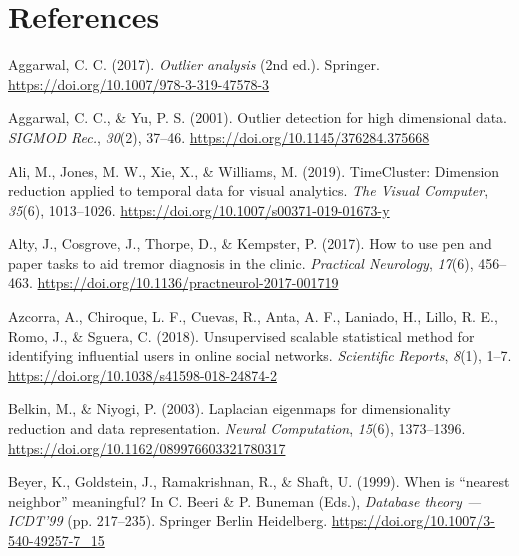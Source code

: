 \documentclass[
  10pt]{article}
\newlength{\cslhangindent}
\newlength{\cslentryspacingunit} %
\newenvironment{CSLReferences}[2] %
 {%
  \setlength{\parindent}{0pt}
  \ifodd #1
  \let\oldpar\par
  \def\par{\hangindent=\cslhangindent\oldpar}
  \fi
  \setlength{\parskip}{#2\cslentryspacingunit}
 }%
 {}
\begin{document}
\section*{References}

\hypertarget{refs}{}
\begin{CSLReferences}{1}{0}
\leavevmode{}%
Aggarwal, C. C. (2017). \emph{Outlier analysis} (2nd ed.). Springer. \url{https://doi.org/10.1007/978-3-319-47578-3}

\leavevmode{}%
Aggarwal, C. C., \& Yu, P. S. (2001). Outlier detection for high dimensional data. \emph{SIGMOD Rec.}, \emph{30}(2), 37--46. \url{https://doi.org/10.1145/376284.375668}

\leavevmode{}%
Ali, M., Jones, M. W., Xie, X., \& Williams, M. (2019). Time{C}luster: Dimension reduction applied to temporal data for visual analytics. \emph{The Visual Computer}, \emph{35}(6), 1013--1026. \url{https://doi.org/10.1007/s00371-019-01673-y}

\leavevmode{}%
Alty, J., Cosgrove, J., Thorpe, D., \& Kempster, P. (2017). How to use pen and paper tasks to aid tremor diagnosis in the clinic. \emph{Practical Neurology}, \emph{17}(6), 456--463. \url{https://doi.org/10.1136/practneurol-2017-001719}

\leavevmode{}%
Azcorra, A., Chiroque, L. F., Cuevas, R., Anta, A. F., Laniado, H., Lillo, R. E., Romo, J., \& Sguera, C. (2018). Unsupervised scalable statistical method for identifying influential users in online social networks. \emph{Scientific Reports}, \emph{8}(1), 1--7. \url{https://doi.org/10.1038/s41598-018-24874-2}

\leavevmode{}%
Belkin, M., \& Niyogi, P. (2003). Laplacian eigenmaps for dimensionality reduction and data representation. \emph{Neural Computation}, \emph{15}(6), 1373--1396. \url{https://doi.org/10.1162/089976603321780317}

\leavevmode{}%
Beyer, K., Goldstein, J., Ramakrishnan, R., \& Shaft, U. (1999). When is {``nearest neighbor''} meaningful? In C. Beeri \& P. Buneman (Eds.), \emph{Database theory --- ICDT'99} (pp. 217--235). Springer Berlin Heidelberg. \url{https://doi.org/10.1007/3-540-49257-7_15}


\end{CSLReferences}
\end{document}

